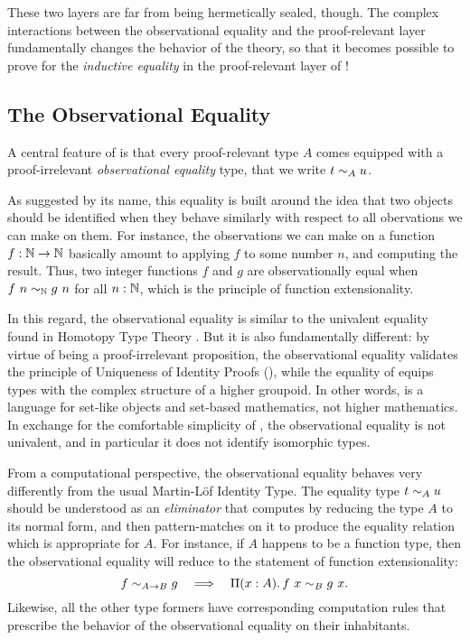 These two layers are far from being hermetically sealed, though. 
% 
The complex interactions between the observational equality and the 
proof-relevant layer fundamentally changes the behavior of the theory, so
that it becomes possible to prove
for the \emph{inductive equality} in the proof-relevant layer of \SetoidCC!

\subsection{The Observational Equality}
\label{sec:obseq-intro}

A central feature of \SetoidCC is that every proof-relevant
% 
% 
type \( A \) comes equipped with a proof-irrelevant \emph{observational equality} 
type, that we write \( {\Obseq[A]{t}{u}} \).

As suggested by its name, this equality is built around the idea that two 
objects should be identified when they behave similarly with respect to all 
obervations we can make on them.
% 
For instance, the observations we can make on a function \( f : \Nat \to \Nat \) 
basically amount to applying \( f \) to some number \( n \), and computing the
result. 
% 
Thus, two integer functions \( f \) and \( g \) are observationally equal 
when \( \Obseq[\Nat]{f\ n}{g\ n} \) for all \( n : \Nat \),
which is the principle of function extensionality.

In this regard, the observational equality is similar to the univalent equality 
found in Homotopy Type Theory . 
% 
But it is also fundamentally different: 
% 
by virtue of being a proof-irrelevant proposition, the observational equality 
validates the principle of Uniqueness of Identity Proofs (\UIP), while the 
equality of \HoTT equips types with the complex structure of a higher groupoid.
% 
In other words, \SetoidCC is a language for set-like objects and set-based 
mathematics, not higher mathematics.
% 
In exchange for the comfortable simplicity of \UIP, the observational equality
is not univalent, and in particular it does not identify isomorphic types.

From a computational perspective, the observational equality behaves very 
differently from the usual Martin-Löf Identity Type.
% 
The equality type \( \Obseq[A]{t}{u} \) should be understood 
as an \emph{eliminator} that computes by reducing the type \( A \) to its 
normal form, and then pattern-matches on it to produce the equality 
relation which is appropriate for \( A \). For instance, if \( A \) happens
to be a function type, then the observational equality will reduce to the
statement of function extensionality:
\[
	\Obseq[\Fun{A}{B}]{f}{g} \quad \Longrightarrow \quad \Depfun{A}{\Obseq[B]{f\ x}{g\ x}}.
\]
Likewise, all the other type formers have corresponding computation rules that
prescribe the behavior of the observational equality on their inhabitants.

